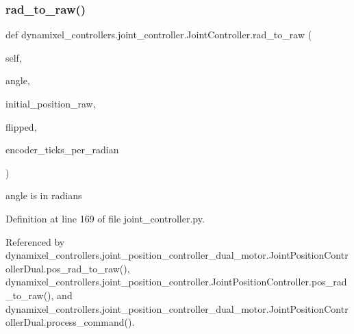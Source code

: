 \subsubsection{\texorpdfstring{rad\+\_\+to\+\_\+raw()}{rad\_to\_raw()}}
{\footnotesize\ttfamily def dynamixel\+\_\+controllers.\+joint\+\_\+controller.\+Joint\+Controller.\+rad\+\_\+to\+\_\+raw (\begin{DoxyParamCaption}\item[{}]{self,  }\item[{}]{angle,  }\item[{}]{initial\+\_\+position\+\_\+raw,  }\item[{}]{flipped,  }\item[{}]{encoder\+\_\+ticks\+\_\+per\+\_\+radian }\end{DoxyParamCaption})\hspace{0.3cm}{\ttfamily [inherited]}}

\begin{DoxyVerb}angle is in radians \end{DoxyVerb}
 

Definition at line 169 of file joint\+\_\+controller.\+py.



Referenced by dynamixel\+\_\+controllers.\+joint\+\_\+position\+\_\+controller\+\_\+dual\+\_\+motor.\+Joint\+Position\+Controller\+Dual.\+pos\+\_\+rad\+\_\+to\+\_\+raw(), dynamixel\+\_\+controllers.\+joint\+\_\+position\+\_\+controller.\+Joint\+Position\+Controller.\+pos\+\_\+rad\+\_\+to\+\_\+raw(), and dynamixel\+\_\+controllers.\+joint\+\_\+position\+\_\+controller\+\_\+dual\+\_\+motor.\+Joint\+Position\+Controller\+Dual.\+process\+\_\+command().



